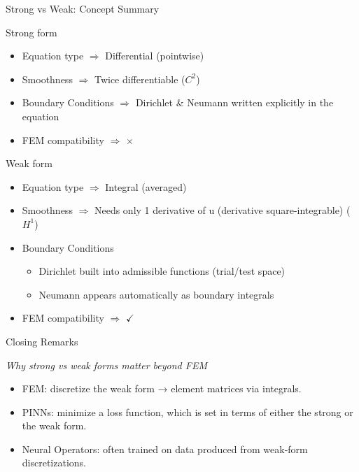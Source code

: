 \documentclass{beamer}
\begin{document}
\begin{frame}{Strong vs Weak: Concept Summary}
  \centering
  \vspace{0.3cm}
  \footnotesize
  \begin{block}{Strong form}
  	\begin{itemize}
  		\item Equation type $\Rightarrow$ Differential (pointwise)
  		
  		\item Smoothness $\Rightarrow$ Twice differentiable ($C^2$)
  		
  		\item Boundary Conditions $\Rightarrow$ Dirichlet \& Neumann written explicitly in the equation
  		
  		\item FEM compatibility $\Rightarrow$ $\times$
  	\end{itemize}
  \end{block}

	
	\begin{block}{Weak form}
		\begin{itemize}
			\footnotesize
			\item Equation type $\Rightarrow$ Integral (averaged)
			
			\item Smoothness $\Rightarrow$ Needs only 1 derivative of 
			u (derivative square-integrable) ($H^1$)
			
			\item Boundary Conditions 
			\begin{itemize}
				\footnotesize
				\item Dirichlet built into admissible functions (trial/test space)
				\item Neumann appears automatically as boundary integrals
			\end{itemize}
			
			\item FEM compatibility $\Rightarrow$ $\checkmark$
		\end{itemize}
	\end{block}
  
\end{frame}

\begin{frame}{Closing Remarks}
  \begin{center}
  \Large
  \textit{Why strong vs weak forms matter beyond FEM}
  \end{center}

  \vspace{0.5cm}
  \small
  \begin{itemize}
  	\item FEM: discretize the weak form → element matrices via integrals.
  	\item PINNs: minimize a loss function, which is set in terms of either the strong or the weak form.
  	\item Neural Operators: often trained on data produced from weak-form discretizations.
  \end{itemize}

\end{frame}

\end{document}
